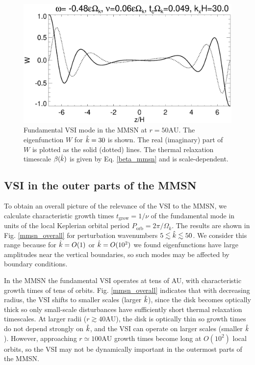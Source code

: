 \begin{figure}
   \includegraphics[width=\linewidth,clip=true,trim=0cm 0.0cm 0cm
  0cm]{figures/eigenvectorW_mmsnkx30.ps}
  \caption{Fundamental VSI mode in the MMSN at 
    $r=50\mathrm{AU}$. The eigenfunction $W$ for $\hat{k}=30$ is shown. The real (imaginary)
    part of $W$ is plotted as the solid (dotted)
    lines. The thermal relaxation timescale $\beta(\hat{k})$ is given by
    Eq. \ref{beta_mmsn} and is scale-dependent. \label{mmsn_eigenW}}    
\end{figure}

\subsection{VSI in the outer parts of the MMSN}
To obtain an overall picture of the relevance of the VSI to the MMSN,
we calculate characteristic growth times $t_\mathrm{grow} = 1/\nu$ of 
the fundamental mode in units of the local Keplerian orbital period
$P_\mathrm{orb}= 2\pi/\Omega_k$. The results are shown in 
Fig. \ref{mmsn_overall} for perturbation wavenumbers $5\lesssim
\hat{k}\lesssim 50$. We consider this range because for  
$\hat{k}=O(1)$ or $\hat{k}=O(10^2)$ we found eigenfunctions have large
amplitudes near the vertical boundaries, so such modes may be affected
by boundary conditions. 

In the MMSN the fundamental VSI operates at tens of AU, with
characteristic growth times of tens of orbits. %
Fig. \ref{mmsn_overall} indicates that with decreasing radius, the VSI
shifts to smaller scales (larger $\hat{k}$), since the disk becomes optically
thick so only small-scale disturbances have sufficiently short thermal
relaxation timescales. At larger radii ($r\gtrsim 
40\mathrm{AU}$), the disk is optically thin so growth times do not depend strongly on   
$\hat{k}$, and the VSI can operate on larger scales (smaller $\hat{k}$).  
However, approaching 
$r\simeq 100\mathrm{AU}$ growth times become long at $O(10^2)$ local orbits,
so the VSI may not be dynamically important in the outermost parts of
the MMSN. 

